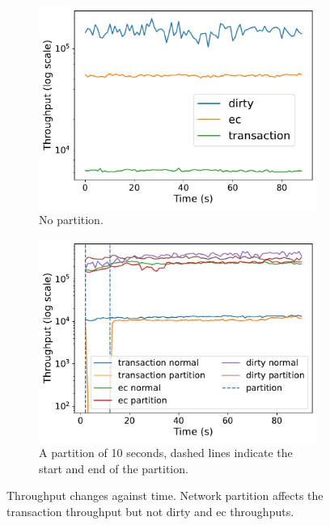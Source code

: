 \begin{figure}[htp]
  \centering
  \begin{subfigure}[t]{\columnwidth}
    \centering
    \includegraphics[width=\columnwidth]{figures/tp_time_single.pdf} 
    \caption{No partition.}
    \label{fig:tp time without partition}
  \end{subfigure}
  
  \begin{subfigure}[t]{\columnwidth}
    \centering
    \includegraphics[width=\columnwidth]{figures/tp_time_partition.pdf} 
    \caption{A partition of 10 seconds, dashed lines indicate the start and
    end of the partition.}
    \label{fig:tp time with partition}
  \end{subfigure}
  \caption{Throughput changes against time. Network partition affects the transaction
  throughput but not dirty and \acrshort{ec} throughputs.}
  \label{fig:tp time partition}
\end{figure}

